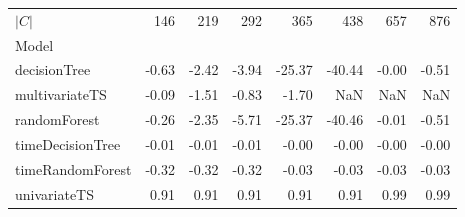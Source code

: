 \begin{tabular}{lrrrrrrr}
\toprule
$|C|$ & 146 & 219 & 292 & 365 & 438 & 657 & 876 \\
Model &  &  &  &  &  &  &  \\
\midrule
decisionTree & -0.63 & -2.42 & -3.94 & -25.37 & -40.44 & -0.00 & -0.51 \\
multivariateTS & -0.09 & -1.51 & -0.83 & -1.70 & NaN & NaN & NaN \\
randomForest & -0.26 & -2.35 & -5.71 & -25.37 & -40.46 & -0.01 & -0.51 \\
timeDecisionTree & -0.01 & -0.01 & -0.01 & -0.00 & -0.00 & -0.00 & -0.00 \\
timeRandomForest & -0.32 & -0.32 & -0.32 & -0.03 & -0.03 & -0.03 & -0.03 \\
univariateTS & 0.91 & 0.91 & 0.91 & 0.91 & 0.91 & 0.99 & 0.99 \\
\bottomrule
\end{tabular}
